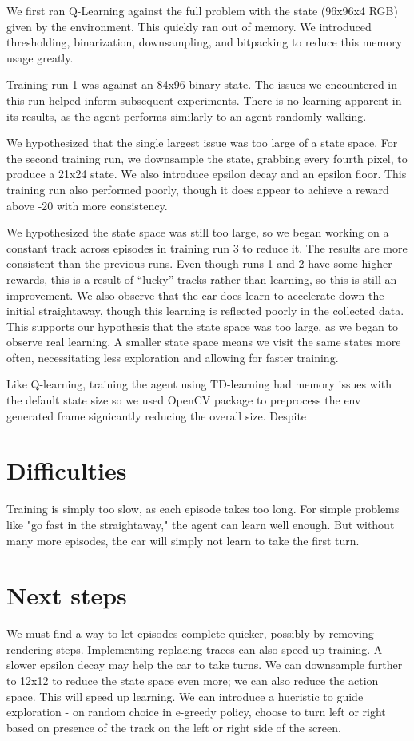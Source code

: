 \documentclass{article}
\begin{document}
We first ran Q-Learning against the full problem with the state (96x96x4
RGB) given by the environment. This quickly ran out of memory. We
introduced thresholding, binarization, downsampling, and bitpacking to
reduce this memory usage greatly.

Training run 1 was against an 84x96 binary state. The issues we
encountered in this run helped inform subsequent experiments. There is
no learning apparent in its results, as the agent performs similarly to
an agent randomly walking.

We hypothesized that the single largest issue was too large of a state
space. For the second training run, we downsample the state, grabbing
every fourth pixel, to produce a 21x24 state. We also introduce epsilon
decay and an epsilon floor. This training run also performed poorly,
though it does appear to achieve a reward above -20 with more
consistency.

We hypothesized the state space was still too large, so we began working
on a constant track across episodes in training run 3 to reduce it. The
results are more consistent than the previous runs. Even though runs 1
and 2 have some higher rewards, this is a result of ``lucky'' tracks
rather than learning, so this is still an improvement. We also observe
that the car does learn to accelerate down the initial straightaway,
though this learning is reflected poorly in the collected data. This
supports our hypothesis that the state space was too large, as we began
to observe real learning.
A smaller state space means we visit the same states more often, necessitating less exploration and allowing for faster training.

Like Q-learning, training the agent using TD-learning had memory issues with the default state size so we used OpenCV package to preprocess the env generated frame signicantly reducing the overall size. Despite 
\section{Difficulties}

Training is simply too slow, as each episode takes too long.
For simple problems like "go fast in the straightaway," the agent can learn well enough.
But without many more episodes, the car will simply not learn to take the first turn.

\section{Next steps}

We must find a way to let episodes complete quicker, possibly by removing rendering steps. 
Implementing replacing traces can also speed up training. 
A slower epsilon decay may help the car to take turns.
We can downsample further to 12x12 to reduce the state space even more; we can also reduce the action space.
This will speed up learning.
We can introduce a hueristic to guide exploration - on random choice in e-greedy policy, choose to turn left or right based on presence of the track on the left or right side of the screen.
\end{document}
